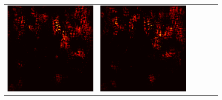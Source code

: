 \documentclass[preprint,12pt]{elsarticle}
\begin{document}
\begin{figure}[p]
\begin{tabular}{cccccc}
  \includegraphics[scale=\scale]{../visualizations/examples/imagenette/cnn/active_saliency_map/1.png} & 
  \includegraphics[scale=\scale]{../visualizations/examples/imagenette/cnn/inactive_saliency_map/1.png} \\
  

\end{tabular}
\end{figure}
\end{document}
